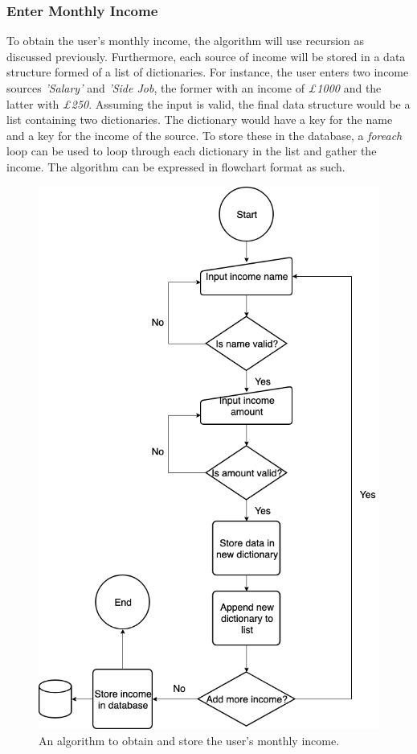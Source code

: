 \documentclass[11pt]{article}
\begin{document}
  \subsubsection{Enter Monthly Income}
  To obtain the user's monthly income, the algorithm will use recursion as discussed previously. Furthermore, each source of income will be stored in a data structure formed of a list of dictionaries. For instance, the user enters two income sources \textit{'Salary'} and \textit{'Side Job}, the former with an income of \textit{£1000} and the latter with \textit{£250}. Assuming the input is valid, the final data structure would be a list containing two dictionaries. The dictionary would have a key for the name and a key for the income of the source. To store these in the database, a \textit{foreach} loop can be used to loop through each dictionary in the list and gather the income.
  The algorithm can be expressed in flowchart format as such.
  \begin{figure}[H]
    \centering
    \includegraphics[scale=0.4]{monthly_income.png}
    \caption{An algorithm to obtain and store the user's monthly income.}
  \end{figure}
\end{document}
